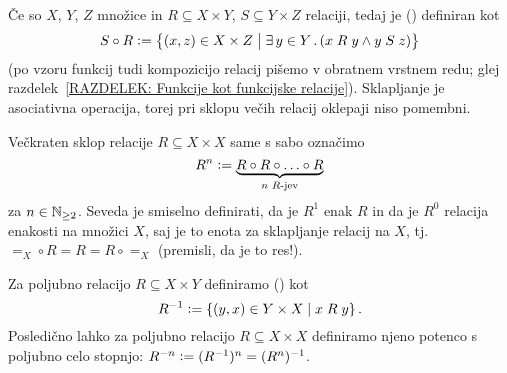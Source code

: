 		Če so $X$, $Y$, $Z$ množice in $R \subseteq X \times Y$, $S \subseteq Y \times Z$ relaciji, tedaj je  ()  definiran kot
		\[S \circ R \dfeq \set[1]{(x, z) \in X \times Z}{\some{y}[Y]{x \mathrel{R} y \land y \mathrel{S} z}}\]
		(po vzoru funkcij tudi kompozicijo relacij pišemo v obratnem vrstnem redu; glej razdelek~\ref{RAZDELEK: Funkcije kot funkcijske relacije}). Sklapljanje je asociativna operacija, torej pri sklopu večih relacij oklepaji niso pomembni.
		
		Večkraten sklop relacije $R \subseteq X \times X$ same s sabo označimo
		\[R^n \mathrel{\mathop:}= \underbrace{R \circ R \circ \ldots \circ R}_{\text{$n$ $R$-jev}}\]
		za $n \in \mathbb{N}_{\geq 2}$. Seveda je smiselno definirati, da je $R^1$ enak $R$ in da je $R^0$ relacija enakosti na množici $X$, saj je to enota za sklapljanje relacij na $X$, tj.~$=_X \circ R = R = R \circ =_X$ (premisli, da je to res!).
		
		Za poljubno relacijo $R \subseteq X \times Y$ definiramo  ()  kot
		\[R^{-1} \dfeq \set{(y, x) \in Y \times X}{x \mathrel{R} y}.\]
		Posledično lahko za poljubno relacijo $R \subseteq X \times X$ definiramo njeno potenco s poljubno celo stopnjo: $R^{-n} \mathrel{\mathop:}= (R^{-1})^n = (R^n)^{-1}$.
		
